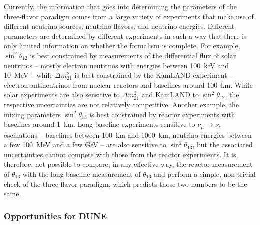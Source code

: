 Currently, the information that goes into determining the parameters of the three-flavor paradigm comes from a large variety of experiments that make use of different neutrino sources, neutrino flavors, and neutrino energies. Different parameters are determined by different experiments in such a way that there is only limited information on whether the formalism is complete. For example, $\sin^2\theta_{12}$ is best constrained by measurements of the differential flux of solar neutrinos -- mostly electron neutrinos with energies between 100~keV and 10~MeV  -- while $\Delta m^2_{21}$ is best constrained by the KamLAND experiment -- electron antineutrinos from nuclear reactors and baselines around 100~km. While solar experiments are also sensitive to $\Delta m^2_{21}$ and KamLAND to $\sin^2\theta_{12}$, the respective uncertainties are not relatively competitive. 
Another example, the mixing parameters $\sin^2\theta_{13}$ is best constrained by reactor experiments with baselines around 1~km. Long-baseline experiments sensitive to $\nu_{\mu}\to\nu_e$ oscillations -- baselines between 100~km and 1000~km, neutrino energies between a few 100~MeV and a few GeV -- are also sensitive to $\sin^2\theta_{13}$, but the associated uncertainties cannot compete with those from the reactor experiments. It is, therefore, not possible to compare, in any effective way, the reactor measurement of $\theta_{13}$ with the long-baseline measurement of $\theta_{13}$ and perform a simple, non-trivial check of the three-flavor paradigm, which predicts those two numbers to be the same. 

\subsubsection{Opportunities for DUNE}


